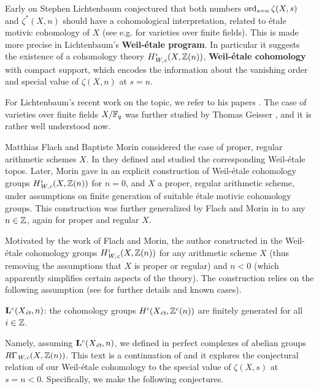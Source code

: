 \documentclass{article}
\numberwithin{equation}{section}
\begin{document}
Early on Stephen Lichtenbaum conjectured that both numbers
$\ord_{s = n} \zeta (X,s)$ and $\zeta^* (X,n)$ should have a cohomological
interpretation, related to étale motivic cohomology of $X$
(see e.g. \cite{Lichtenbaum-1984} for varieties over finite fields).
This is made more precise in Lichtenbaum's \textbf{Weil-étale program}.
In particular it suggests the existence of a cohomology theory
$H^i_\Wc (X, \ZZ (n))$, \textbf{Weil-étale cohomology} with compact support,
which encodes the information about the vanishing order and special value of
$\zeta (X,n)$ at $s = n$.

For Lichtenbaum's recent work on the topic, we refer to his papers
\cite{Lichtenbaum-2005,Lichtenbaum-2009-number-rings,Lichtenbaum-2009-Euler-char,Lichtenbaum-2021}.
The case of varieties over finite fields $X/\FF_q$ was further studied by
Thomas Geisser
\cite{Geisser-2004,Geisser-2006,Geisser-2010-arithmetic-homology},
and it is rather well understood now.

Matthias Flach and Baptiste Morin considered the case of proper, regular
arithmetic schemes $X$. In \cite{Flach-Morin-2012} they defined and studied the
corresponding Weil-étale topos. Later, Morin gave in \cite{Morin-2014} an
explicit construction of Weil-étale cohomology groups $H^i_\Wc (X, \ZZ (n))$ for
$n = 0$, and $X$ a proper, regular arithmetic scheme, under assumptions on
finite generation of suitable étale motivic cohomology groups. This construction
was further generalized by Flach and Morin in \cite{Flach-Morin-2018} to any
$n \in \ZZ$, again for proper and regular $X$.

Motivated by the work of Flach and Morin, the author constructed in
\cite{Beshenov-Weil-etale-1} the Weil-étale cohomology groups
$H^i_\Wc (X, \ZZ (n))$ for any arithmetic scheme $X$ (thus removing the
assumptions that $X$ is proper or regular) and $n < 0$ (which apparently
simplifies certain aspects of the theory). The construction relies on the
following assumption (see \cite[\S 8]{Beshenov-Weil-etale-1} for further details
and known cases).

\begin{conjecture*}
  $\mathbf{L}^c (X_\et,n)$: the cohomology groups $H^i (X_\et, \ZZ^c (n))$ are
  finitely generated for all $i \in \ZZ$.
\end{conjecture*}

Namely, assuming $\mathbf{L}^c (X_\et,n)$, we defined in
\cite{Beshenov-Weil-etale-1} perfect complexes of abelian groups
$R\Gamma_\Wc (X, \ZZ(n))$. This text is a continuation of
\cite{Beshenov-Weil-etale-1} and it explores the conjectural relation of our
Weil-étale cohomology to the special value of $\zeta (X,s)$ at $s = n < 0$.
Specifically, we make the following conjectures.
\end{document}
